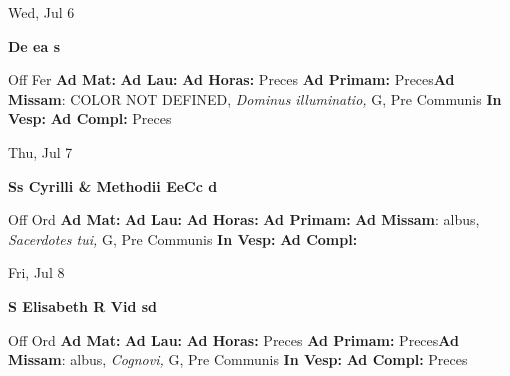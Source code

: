 \documentclass[10pt]{memoir}
\begin{document}
\begin{center}
\begin{minipage}{3.5in}
\vspace{2em}
\begin{center}Wed, Jul 6
\end{center}
\textbf{ \large De ea
\textnormal{\normalsize s}}

\begin{justify}Off Fer
\textbf{Ad Mat: }
\textbf{Ad Lau: }
\textbf{Ad Horas: }Preces
\textbf{Ad Primam: }Preces\textbf{Ad Missam}: COLOR NOT DEFINED, \textit{Dominus illuminatio,} G, Pre Communis
\textbf{In Vesp: }
\textbf{Ad Compl: }Preces
\end{justify}
\end{minipage}
\end{center}

\begin{center}
\begin{minipage}{3.5in}
\vspace{2em}
\begin{center}Thu, Jul 7
\end{center}
\textbf{ \large Ss Cyrilli \& Methodii EeCc
\textnormal{\normalsize d}}

\begin{justify}Off Ord
\textbf{Ad Mat: }
\textbf{Ad Lau: }
\textbf{Ad Horas: }
\textbf{Ad Primam: }\textbf{Ad Missam}: albus, \textit{Sacerdotes tui,} G, Pre Communis
\textbf{In Vesp: }
\textbf{Ad Compl: }
\end{justify}
\end{minipage}
\end{center}

\begin{center}
\begin{minipage}{3.5in}
\vspace{2em}
\begin{center}Fri, Jul 8
\end{center}
\textbf{ \large S Elisabeth R Vid
\textnormal{\normalsize sd}}

\begin{justify}Off Ord
\textbf{Ad Mat: }
\textbf{Ad Lau: }
\textbf{Ad Horas: }Preces
\textbf{Ad Primam: }Preces\textbf{Ad Missam}: albus, \textit{Cognovi,} G, Pre Communis
\textbf{In Vesp: }
\textbf{Ad Compl: }Preces
\end{justify}
\end{minipage}
\end{center}
\end{document}
